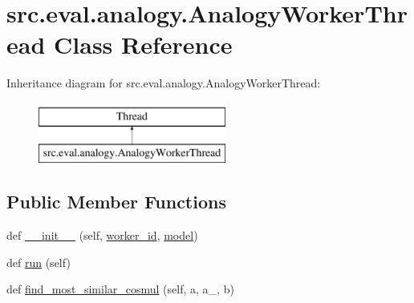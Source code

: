 \hypertarget{classsrc_1_1eval_1_1analogy_1_1_analogy_worker_thread}{}\section{src.\+eval.\+analogy.\+Analogy\+Worker\+Thread Class Reference}
\label{classsrc_1_1eval_1_1analogy_1_1_analogy_worker_thread}
Inheritance diagram for src.\+eval.\+analogy.\+Analogy\+Worker\+Thread\+:\begin{figure}[H]
\begin{center}
\leavevmode
\includegraphics[height=2.000000cm]{classsrc_1_1eval_1_1analogy_1_1_analogy_worker_thread}
\end{center}
\end{figure}
\subsection*{Public Member Functions}
\begin{DoxyCompactItemize}
\item 
def \hyperlink{classsrc_1_1eval_1_1analogy_1_1_analogy_worker_thread_a8c02b7e5589b607622f4f2e69db5eec0}{\+\_\+\+\_\+init\+\_\+\+\_\+} (self, \hyperlink{classsrc_1_1eval_1_1analogy_1_1_analogy_worker_thread_a8b2c2720d9c294ddc0b020ad64174e6f}{worker\+\_\+id}, \hyperlink{classsrc_1_1eval_1_1analogy_1_1_analogy_worker_thread_aab57ebb5a41ee124300ac2125083bf3d}{model})
\item 
def \hyperlink{classsrc_1_1eval_1_1analogy_1_1_analogy_worker_thread_a4f959a591d5130eeb6a03ef2545c8756}{run} (self)
\item 
def \hyperlink{classsrc_1_1eval_1_1analogy_1_1_analogy_worker_thread_af2f9a01892a4dd4fa2ff8e87114b7b08}{find\+\_\+most\+\_\+similar\+\_\+cosmul} (self, a, a\+\_\+, b)
\end{DoxyCompactItemize}
